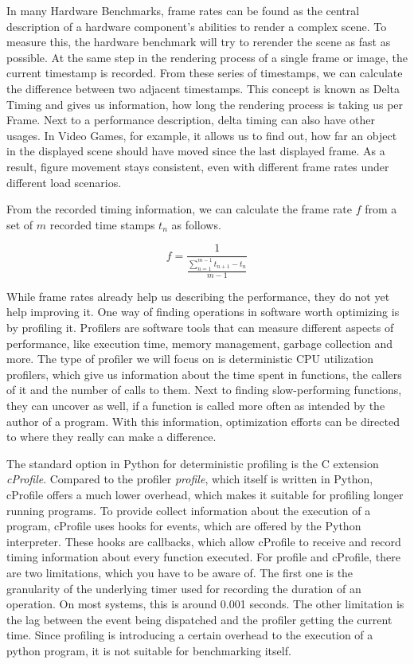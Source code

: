 In many Hardware Benchmarks, frame rates can be found as the central description
of a hardware component's abilities to render a complex scene. To measure this,
the hardware benchmark will try to rerender the scene as fast as possible. At
the same step in the rendering process of a single frame or image, the current
timestamp is recorded. From these series of timestamps, we can calculate the
difference between two adjacent timestamps. This concept is known as Delta
Timing and gives us information, how long the rendering process is taking us per
Frame. Next to a performance description, delta timing can also have other
usages. In Video Games, for example, it allows us to find out, how far an object
in the displayed scene should have moved since the last displayed frame. As a
result, figure movement stays consistent, even with different frame rates under
different load scenarios.
\cite{DeltaTiming}

From the recorded timing information, we can calculate the frame rate $f$ from a
set of $m$ recorded time stamps $t_n$ as follows.
\cite{FrameRates}

$$f = \frac{1}{\frac{ \sum_{n=1}^{m-1} t_{n+1} - t_{n} }{ m - 1 }}$$

While frame rates already help us describing the performance, they do not yet help
improving it. One way of finding operations in software worth optimizing is by
profiling it.  Profilers are software tools that can measure different
aspects of performance, like execution time, memory management, garbage
collection and more. The type of profiler we will focus on is deterministic CPU
utilization profilers, which give us information about the time spent in
functions, the callers of it and the number of calls to them. Next to finding
slow-performing functions, they can uncover as well, if a function is called
more often as intended by the author of a program. With this information, optimization
efforts can be directed to where they really can make a difference.
\cite{CProfilerExample}

The standard option in Python for deterministic profiling is the C extension
\emph{cProfile}. Compared to the profiler \emph{profile}, which itself is
written in Python, cProfile offers a much lower overhead, which makes it
suitable for profiling longer running programs.  To provide collect information
about the execution of a program, cProfile uses hooks for events, which are
offered by the Python interpreter. These hooks are callbacks, which allow
cProfile to receive and record timing information about every function executed.
For profile and cProfile, there are two limitations, which you have to be aware
of. The first one is the granularity of the underlying
timer used for recording the duration of an operation. On most systems, this is
around 0.001 seconds.  The other limitation is the lag between the event being
dispatched and the profiler getting the current time. Since profiling is
introducing a certain overhead to the execution of a python program, it is not
suitable for benchmarking itself.
\cite{CProfiler}
